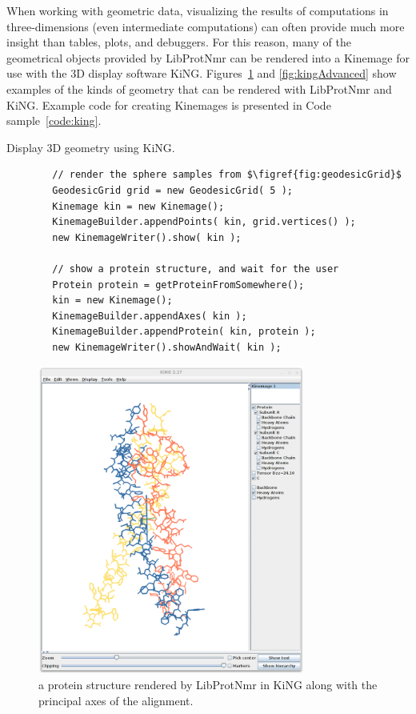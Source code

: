 \documentclass[11pt]{article}
\newcommand{\software}[1]{{\sc #1}}
\newcommand{\figref}[1]{Figure~\ref{#1}}
\newcommand{\figreftwo}[2]{Figures~\ref{#1} and \ref{#2}}
\newcommand{\coderef}[1]{Code sample~\ref{#1}}
\newenvironment{codesample}
{
\begin{codesamplefloat}
\centering
\RecustomVerbatimEnvironment{Verbatim}{BVerbatim}{}
\vspace{0.1in}
}{
\end{codesamplefloat}
}
\newcommand{\libprotnmr}{\software{LibProtNmr}}
\begin{document}
When working with geometric data, visualizing the results of computations in three-dimensions (even intermediate computations) can often provide much more insight than tables, plots, and debuggers. For this reason, many of the geometrical objects provided by {\libprotnmr} can be rendered into a Kinemage for use with the 3D display software KiNG. \figreftwo{fig:kingProtein}{fig:kingAdvanced} show examples of the kinds of geometry that can be rendered with {\libprotnmr} and KiNG. Example code for creating Kinemages is presented in \coderef{code:king}.

\begin{codesample}
	\caption{
		Display 3D geometry using KiNG.
	}
	\begin{verbatim}
		// render the sphere samples from $\figref{fig:geodesicGrid}$
		GeodesicGrid grid = new GeodesicGrid( 5 );
		Kinemage kin = new Kinemage();
		KinemageBuilder.appendPoints( kin, grid.vertices() );
		new KinemageWriter().show( kin );
		
		// show a protein structure, and wait for the user
		Protein protein = getProteinFromSomewhere();
		kin = new Kinemage();
		KinemageBuilder.appendAxes( kin );
		KinemageBuilder.appendProtein( kin, protein );
		new KinemageWriter().showAndWait( kin );
	\end{verbatim}
	\label{code:king}
\end{codesample}

\begin{figure}
	\centering
	\includegraphics[height=4in]{figures/kingProtein}
	\caption{
		a protein structure rendered by {\libprotnmr} in KiNG along with the principal axes of the alignment.
	}
	\label{fig:kingProtein}
\end{figure}
\end{document}
